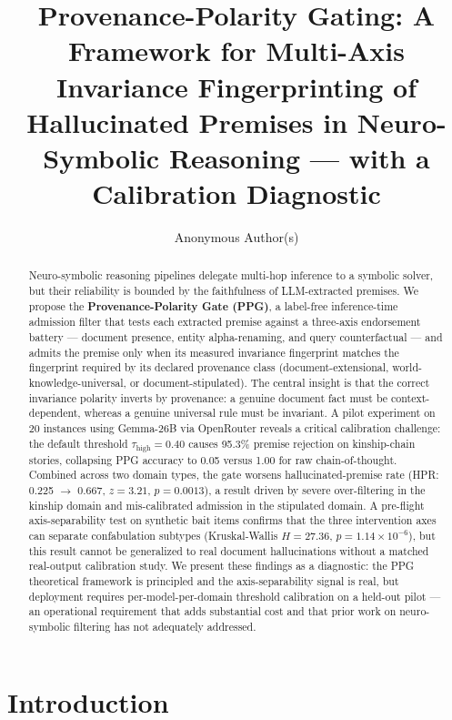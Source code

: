 \documentclass[11pt,letterpaper]{article}
\title{\textbf{Provenance-Polarity Gating: A Framework for Multi-Axis Invariance Fingerprinting of Hallucinated Premises in Neuro-Symbolic Reasoning --- with a Calibration Diagnostic}}
\author{Anonymous Author(s)}
\date{}
\begin{document}
\maketitle

\begin{abstract}
Neuro-symbolic reasoning pipelines delegate multi-hop inference to a symbolic solver, but their reliability is bounded by
the faithfulness of LLM-extracted premises. We propose the \textbf{Provenance-Polarity Gate (PPG)}, a label-free inference-time admission
filter that tests each extracted premise against a three-axis endorsement battery --- document presence, entity alpha-renaming,
and query counterfactual --- and admits the premise only when its measured invariance fingerprint matches the fingerprint
required by its declared provenance class (document-extensional, world-knowledge-universal, or document-stipulated). The
central insight is that the correct invariance polarity inverts by provenance: a genuine document fact must be context-dependent,
whereas a genuine universal rule must be invariant. A pilot experiment on 20 instances using Gemma-26B via OpenRouter reveals
a critical calibration challenge: the default threshold $\tau_{\mathrm{high}}=0.40$ causes 95.3\% premise rejection on kinship-chain stories,
collapsing PPG accuracy to 0.05 versus 1.00 for raw chain-of-thought. Combined across two domain types, the gate worsens
hallucinated-premise rate (HPR: 0.225 $\to$ 0.667, $z=3.21$, $p=0.0013$), a result driven by severe over-filtering in the kinship
domain and mis-calibrated admission in the stipulated domain. A pre-flight axis-separability test on synthetic bait items
confirms that the three intervention axes can separate confabulation subtypes (Kruskal-Wallis $H=27.36$, $p=1.14\times10^{-6}$), but this
result cannot be generalized to real document hallucinations without a matched real-output calibration study. We present
these findings as a diagnostic: the PPG theoretical framework is principled and the axis-separability signal is real, but
deployment requires per-model-per-domain threshold calibration on a held-out pilot --- an operational requirement that adds
substantial cost and that prior work on neuro-symbolic filtering has not adequately addressed.
\end{abstract}

\section{Introduction}
\end{document}
